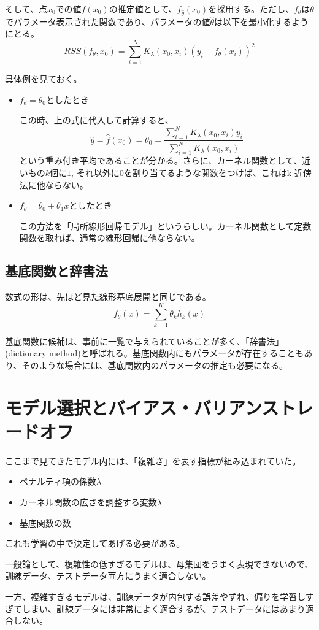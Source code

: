 \documentclass{jsarticle}
\begin{document}
そして、点$x_0$での値$f(x_0)$の推定値として、$f_{\hat{\theta}}(x_0)$を採用する。ただし、$f_{\theta}$は$\theta$でパラメータ表示された関数であり、パラメータの値$\hat{\theta}$は以下を最小化するようにとる。
\[
  RSS(f_\theta,x_0)=\sum_{i=1}^NK_\lambda(x_0,x_i)(y_i-f_\theta(x_i))^2
\]

具体例を見ておく。
\begin{itemize}
  \item $f_\theta=\theta_0$としたとき

  この時、上の式に代入して計算すると、
  \[
    \hat{y}=\hat{f}(x_0)=\theta_0=\frac{\sum_{i=1}^NK_\lambda(x_0,x_i)y_i}{\sum_{i=1}^NK_\lambda(x_0,x_i)}
  \]
  という重み付き平均であることが分かる。さらに、カーネル関数として、近いもの$k$個に$1$, それ以外に$0$を割り当てるような関数をつけば、これはk-近傍法に他ならない。
  \item $f_\theta=\theta_0+\theta_1x$としたとき

  この方法を「局所線形回帰モデル」というらしい。カーネル関数として定数関数を取れば、通常の線形回帰に他ならない。
\end{itemize}
\subsection{基底関数と辞書法}
数式の形は、先ほど見た線形基底展開と同じである。
\[
  f_\theta(x) = \sum_{k=1}^K\theta_kh_k(x)
\]

基底関数に候補は、事前に一覧で与えられていることが多く、「辞書法」(dictionary method)と呼ばれる。基底関数内にもパラメータが存在することもあり、そのような場合には、基底関数内のパラメータの推定も必要になる。

\section{モデル選択とバイアス・バリアンストレードオフ}
ここまで見てきたモデル内には、「複雑さ」を表す指標が組み込まれていた。
\begin{itemize}
  \item ペナルティ項の係数$\lambda$
  \item カーネル関数の広さを調整する変数$\lambda$
  \item 基底関数の数
\end{itemize}
これも学習の中で決定してあげる必要がある。

一般論として、複雑性の低すぎるモデルは、母集団をうまく表現できないので、訓練データ、テストデータ両方にうまく適合しない。

一方、複雑すぎるモデルは、訓練データが内包する誤差やずれ、偏りを学習しすぎてしまい、訓練データには非常によく適合するが、テストデータにはあまり適合しない。
\end{document}
